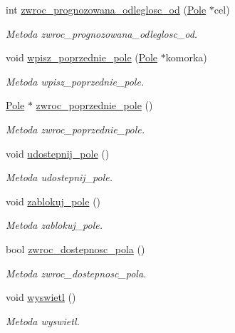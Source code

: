 \begin{DoxyCompactItemize}
int \hyperlink{class_pole_a8e93eb37782409bdae4bb33be6104424}{zwroc\+\_\+prognozowana\+\_\+odleglosc\+\_\+od} (\hyperlink{class_pole}{Pole} $\ast$cel)
\begin{DoxyCompactList}\small\item\em Metoda zwroc\+\_\+prognozowana\+\_\+odleglosc\+\_\+od. \end{DoxyCompactList}\item 
void \hyperlink{class_pole_af051a55aeca98ed75118c9c5e3a715b1}{wpisz\+\_\+poprzednie\+\_\+pole} (\hyperlink{class_pole}{Pole} $\ast$komorka)
\begin{DoxyCompactList}\small\item\em Metoda wpisz\+\_\+poprzednie\+\_\+pole. \end{DoxyCompactList}\item 
\hyperlink{class_pole}{Pole} $\ast$ \hyperlink{class_pole_afc63a4d3a317aa52f61160e3133a4e71}{zwroc\+\_\+poprzednie\+\_\+pole} ()
\begin{DoxyCompactList}\small\item\em Metoda zwroc\+\_\+poprzednie\+\_\+pole. \end{DoxyCompactList}\item 
void \hyperlink{class_pole_a5d3b3464483fbdf43d3dda8daacb20b5}{udostepnij\+\_\+pole} ()
\begin{DoxyCompactList}\small\item\em Metoda udostepnij\+\_\+pole. \end{DoxyCompactList}\item 
void \hyperlink{class_pole_adddbe3e64207aea983031677122859dd}{zablokuj\+\_\+pole} ()
\begin{DoxyCompactList}\small\item\em Metoda zablokuj\+\_\+pole. \end{DoxyCompactList}\item 
bool \hyperlink{class_pole_abb64dc912421add246012e62c5cccbc6}{zwroc\+\_\+dostepnosc\+\_\+pola} ()
\begin{DoxyCompactList}\small\item\em Metoda zwroc\+\_\+dostepnosc\+\_\+pola. \end{DoxyCompactList}\item 
void \hyperlink{class_pole_a6085f9bb181c3951f9ab904de01c4b0f}{wyswietl} ()
\begin{DoxyCompactList}\small\item\em Metoda wyswietl. \end{DoxyCompactList}\end{DoxyCompactItemize}
